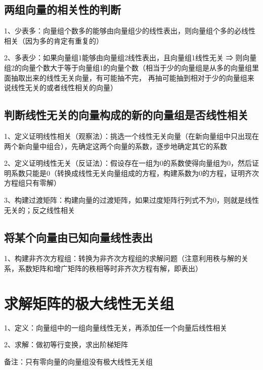 \subsection{两组向量的相关性的判断}

1、少表多：向量组个数多的能够由向量组少的线性表出，则向量组个多的必线性相关（因为多的肯定有重复的）

2、多表少：如果向量组1能够由向量组2线性表出，且向量组1线性无关 ⇒ 则向量组2的向量个数大于等于向量组1的向量个数（相当于少的向量组是从多的向量组里面抽取出来的线性无关向量，有可能抽不完， 再抽可能抽到相对于少的向量组来说线性无关的或者线性相关的向量）



\subsection{判断线性无关的向量构成的新的向量组是否线性相关}

1、定义证明线性相关（观察法）：挑选一个线性无关向量（在新向量组中只出现在两个新向量中组合），先确定这两个向量的系数，逐步地确定其它的系数

2、定义证明线性无关（反证法）：假设存在一组为0的系数使得向量组为0，然后证明系数只能是0（转换成线性无关向量组成的方程，构建系数为0的方程，证明齐次方程组只有零解）

3、构建过渡矩阵：构建向量的过渡矩阵，如果过度矩阵行列式不为0，则就是线性无关的；反之线性相关



\subsection{将某个向量由已知向量线性表出}

1、构建非齐次方程组：转换为非齐次方程组的求解问题（注意利用秩与解的关系，系数矩阵和增广矩阵的秩相等时非齐次方程有解，即表出）

\section{求解矩阵的极大线性无关组}

1、定义：向量组中的一组向量线性无关，再添加任一个向量后线性相关

2、求解：做初等行变换，求出阶梯矩阵

备注：只有零向量的向量组没有极大线性无关组

